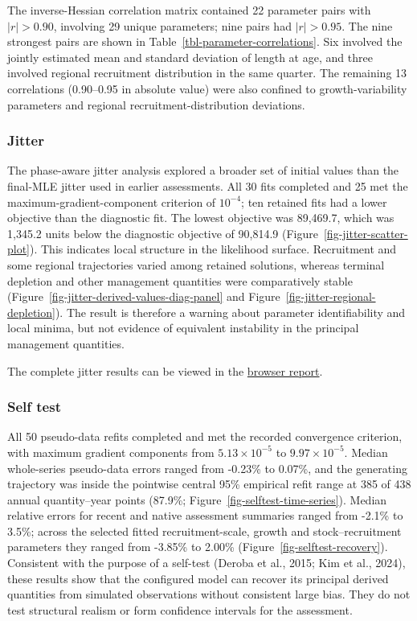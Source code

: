 \documentclass[
  english,
  a4paper,
  a4paper,
  11pt]{SCreport}
\begin{document}
The inverse-Hessian correlation matrix contained 22 parameter pairs with
\(|r| > 0.90\), involving 29 unique parameters; nine pairs had
\(|r| > 0.95\). The nine strongest pairs are shown in
Table~\ref{tbl-parameter-correlations}. Six involved the jointly
estimated mean and standard deviation of length at age, and three
involved regional recruitment distribution in the same quarter. The
remaining 13 correlations (0.90--0.95 in absolute value) were also
confined to growth-variability parameters and regional
recruitment-distribution deviations.

\subsubsection{Jitter}\label{sec-diag-jitter}

The phase-aware jitter analysis explored a broader set of initial values
than the final-MLE jitter used in earlier assessments. All 30 fits
completed and 25 met the maximum-gradient-component criterion of
\(10^{-4}\); ten retained fits had a lower objective than the diagnostic
fit. The lowest objective was 89,469.7, which was 1,345.2 units below
the diagnostic objective of 90,814.9
(Figure~\ref{fig-jitter-scatter-plot}). This indicates local structure
in the likelihood surface. Recruitment and some regional trajectories
varied among retained solutions, whereas terminal depletion and other
management quantities were comparatively stable
(Figure~\ref{fig-jitter-derived-values-diag-panel} and
Figure~\ref{fig-jitter-regional-depletion}). The result is therefore a
warning about parameter identifiability and local minima, but not
evidence of equivalent instability in the principal management
quantities.

The complete jitter results can be viewed in the
\href{https://pacificcommunity.github.io/ofp-sam-bet-2026-jitter/jitter-report.html}{browser
report}.

\subsubsection{Self test}\label{sec-selftest}

All 50 pseudo-data refits completed and met the recorded convergence
criterion, with maximum gradient components from \(5.13\times10^{-5}\)
to \(9.97\times10^{-5}\). Median whole-series pseudo-data errors ranged
from -0.23\% to 0.07\%, and the generating trajectory was inside the
pointwise central 95\% empirical refit range at 385 of 438 annual
quantity--year points (87.9\%; Figure~\ref{fig-selftest-time-series}).
Median relative errors for recent and native assessment summaries ranged
from -2.1\% to 3.5\%; across the selected fitted recruitment-scale,
growth and stock--recruitment parameters they ranged from -3.85\% to
2.00\% (Figure~\ref{fig-selftest-recovery}). Consistent with the purpose
of a self-test (Deroba et al., 2015; Kim et al., 2024), these results
show that the configured model can recover its principal derived
quantities from simulated observations without consistent large bias.
They do not test structural realism or form confidence intervals for the
assessment.
\end{document}

